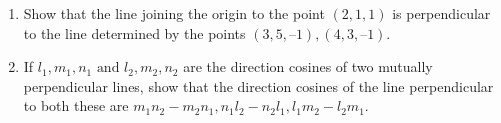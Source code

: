 \begin{enumerate}[label=\thesection.\arabic*,ref=\thesection.\theenumi]
		\item 
 Show that the line joining the origin to the point $(2, 1, 1)$ is perpendicular to the
line determined by the points $(3, 5, – 1), (4, 3, – 1)$.
\\
    \solution
		
	\item  If $l_1, m_1,n_1 \text{ and } l_2,m_2,n_2$ are the direction cosines of two mutually perpendicular lines, show that the direction cosines of the line perpendicular to both these are  $m_1n_2-m_2n_1,n_1l_2-n_2l_1,l_1m_2-l_2m_1$.
\\
    \solution
		
\end{enumerate}

